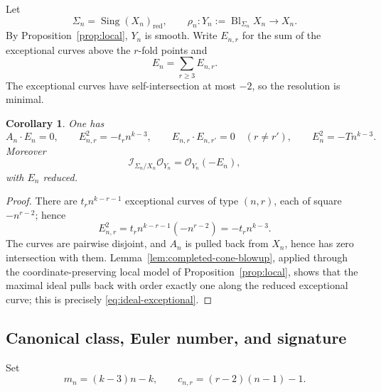 \documentclass[11pt]{article}
\newtheorem{corollary}[theorem]{Corollary}
\newcommand{\OO}{\mathcal O}
\newcommand{\cI}{\mathcal I}
\newcommand{\Bl}{\operatorname{Bl}}
\newcommand{\Sing}{\operatorname{Sing}}
\begin{document}
Let
\[
        \Sigma_n=\Sing(X_n)_{\mathrm{red}},
        \qquad
        \rho_n:Y_n:=\Bl_{\Sigma_n}X_n\longrightarrow X_n.
\]
By Proposition~\ref{prop:local}, $Y_n$ is smooth.  Write $E_{n,r}$ for the sum of
the exceptional curves above the $r$-fold points and
\[
        E_n=\sum_{r\ge3}E_{n,r}.
\]
The exceptional curves have self-intersection at most $-2$, so the resolution is
minimal.

\begin{corollary}\label{cor:intersection}
One has
\[
 A_n\cdot E_n=0,
 \qquad
 E_{n,r}^2=-t_r n^{k-3},
 \qquad
 E_{n,r}\cdot E_{n,r'}=0\quad(r\ne r'),
 \qquad
 E_n^2=-Tn^{k-3}.
\]
Moreover
\begin{equation}\label{eq:ideal-exceptional}
        \cI_{\Sigma_n/X_n}\OO_{Y_n}=\OO_{Y_n}(-E_n),
\end{equation}
with $E_n$ reduced.
\end{corollary}

\begin{proof}
There are $t_rn^{k-r-1}$ exceptional curves of type $(n,r)$, each of square
$-n^{r-2}$; hence
\[
 E_{n,r}^2=t_rn^{k-r-1}(-n^{r-2})=-t_rn^{k-3}.
\]  The curves are
pairwise disjoint, and $A_n$ is pulled back from $X_n$, hence has zero
intersection with them.  Lemma~\ref{lem:completed-cone-blowup}, applied through the coordinate-preserving
local model of Proposition~\ref{prop:local}, shows that the maximal ideal pulls
back with order exactly one along the reduced exceptional curve; this is
precisely \eqref{eq:ideal-exceptional}.
\end{proof}

\subsection{Canonical class, Euler number, and signature}

Set
\[
        m_n=(k-3)n-k,
        \qquad
        c_{n,r}=(r-2)(n-1)-1.
\]
\end{document}
